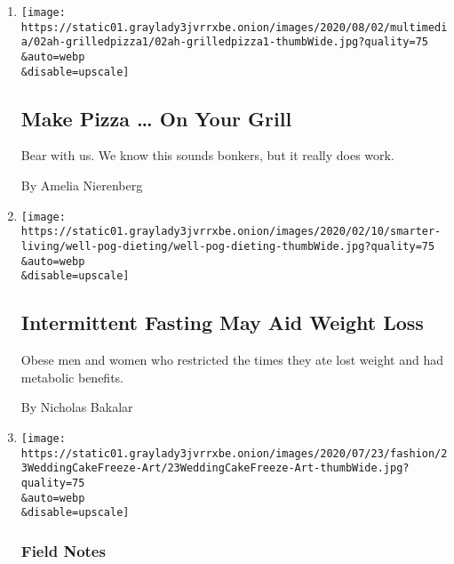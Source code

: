 \begin{enumerate}
\def\labelenumi{\arabic{enumi}.}
\item
  \href{/2020/08/01/at-home/coronavirus-make-pizza-on-a-grill.html}{}

  \texttt{[image: https://static01.graylady3jvrrxbe.onion/images/2020/08/02/multimedia/02ah-grilledpizza1/02ah-grilledpizza1-thumbWide.jpg?quality=75\\\&auto=webp\\\&disable=upscale]}

  \hypertarget{make-pizza--on-your-grill}{%
  \subsection{Make Pizza \ldots{} On Your
  Grill}\label{make-pizza--on-your-grill}}

  Bear with us. We know this sounds bonkers, but it really does work.

  By Amelia Nierenberg
\item
  \href{/2020/07/27/well/eat/intermittent-fasting-may-aid-weight-loss.html}{}

  \texttt{[image: https://static01.graylady3jvrrxbe.onion/images/2020/02/10/smarter-living/well-pog-dieting/well-pog-dieting-thumbWide.jpg?quality=75\\\&auto=webp\\\&disable=upscale]}

  \hypertarget{intermittent-fasting-may-aid-weight-loss}{%
  \subsection{Intermittent Fasting May Aid Weight
  Loss}\label{intermittent-fasting-may-aid-weight-loss}}

  Obese men and women who restricted the times they ate lost weight and
  had metabolic benefits.

  By Nicholas Bakalar
\item
  \href{/2020/07/22/fashion/weddings/do-you-really-want-that-wedding-cake-a-year-later.html}{}

  \texttt{[image: https://static01.graylady3jvrrxbe.onion/images/2020/07/23/fashion/23WeddingCakeFreeze-Art/23WeddingCakeFreeze-Art-thumbWide.jpg?quality=75\\\&auto=webp\\\&disable=upscale]}

  \hypertarget{field-notes}{%
  \subsubsection{Field Notes}\label{field-notes}}

  \hypertarget{do-you-really-want-that-wedding-cake-a-year-later}{%
}
\end{enumerate}
